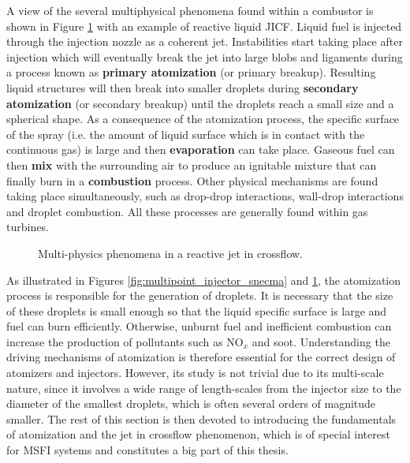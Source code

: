 A view of the several multiphysical phenomena found within a combustor is shown in Figure \ref{fig:JICF_multiphysics} with an example of reactive liquid JICF. Liquid fuel is injected through the injection nozzle as a coherent jet. Instabilities start taking place after injection which will eventually break the jet into large blobs and ligaments during a process known as \textbf{primary atomization} (or primary breakup). Resulting liquid structures will then break into smaller droplets during \textbf{secondary atomization} (or secondary breakup) until the droplets reach a small size and a spherical shape. As a consequence of the atomization process, the specific surface of the spray (i.e. the amount of liquid surface which is in contact with the continuous gas) is large and then \textbf{evaporation} can take place. Gaseous fuel can then \textbf{mix} with the surrounding air  to produce an ignitable mixture that can finally burn in a \textbf{combustion} process. Other physical mechanisms are found taking place simultaneously, such as drop-drop interactions, wall-drop interactions and droplet combustion. All these processes are generally found within gas turbines.

\begin{figure}[ht]
     \centering
      \caption{Multi-physics phenomena in a reactive jet in crossflow. }
      \label{fig:JICF_multiphysics}
\end{figure}

As illustrated in Figures \ref{fig:multipoint_injector_snecma} and \ref{fig:JICF_multiphysics}, the atomization process is responsible for the generation of droplets. It is necessary that the size of these droplets is small enough so that the liquid specific surface is large and fuel can burn efficiently. Otherwise, unburnt fuel and inefficient combustion can increase the production of pollutants such as NO$_x$ and soot. Understanding the driving mechanisms of atomization is therefore essential for the correct design of atomizers and injectors. However, its study is not trivial due to its multi-scale nature, since it involves a wide range of length-scales from the injector size to the diameter of the smallest droplets, which is often several orders of magnitude smaller.  The rest of this section is then devoted to introducing the fundamentals of atomization and the jet in crossflow phenomenon, which is of special interest for MSFI systems and constitutes a big part of this thesis.

